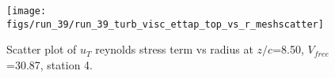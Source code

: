 \begin{figure}[H]
\centering
\texttt{[image: figs/run\_39/run\_39\_turb\_visc\_ettap\_top\_vs\_r\_meshscatter]}
\caption{Scatter plot of $
u_T$ reynolds stress term vs radius at $z/c$=8.50, $V_{free}$=30.87, station 4.}
\label{fig:run_39_turb_visc_ettap_top_vs_r_meshscatter}
\end{figure}


